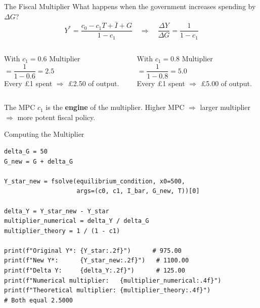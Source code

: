 \documentclass[aspectratio=169, 10pt]{beamer}
\begin{document}
\begin{frame}{The Fiscal Multiplier}
What happens when the government increases spending by $\Delta G$?
\vspace{0.3em}
\[
  Y^* = \frac{c_0 - c_1 T + \bar{I} + G}{1 - c_1}
  \quad\Longrightarrow\quad
  \frac{\Delta Y}{\Delta G} = \frac{1}{1 - c_1}
\]
\vspace{0.3em}
\begin{columns}[T]
\begin{block}{With $c_1 = 0.6$}
  Multiplier $= \dfrac{1}{1 - 0.6} = 2.5$\\[6pt]
  Every \pounds1 spent $\Rightarrow$ \pounds2.50 of output.
\end{block}
\begin{block}{With $c_1 = 0.8$}
  Multiplier $= \dfrac{1}{1 - 0.8} = 5.0$\\[6pt]
  Every \pounds1 spent $\Rightarrow$ \pounds5.00 of output.
\end{block}
\end{columns}
\vspace{0.5em}
The MPC $c_1$ is the \textbf{engine} of the multiplier.
Higher MPC $\Rightarrow$ larger multiplier $\Rightarrow$ more potent fiscal policy.
\end{frame}

\begin{frame}[fragile]{Computing the Multiplier}
\begin{lstlisting}
delta_G = 50
G_new = G + delta_G

Y_star_new = fsolve(equilibrium_condition, x0=500,
                    args=(c0, c1, I_bar, G_new, T))[0]

delta_Y = Y_star_new - Y_star
multiplier_numerical = delta_Y / delta_G
multiplier_theory = 1 / (1 - c1)

print(f"Original Y*: {Y_star:.2f}")      # 975.00
print(f"New Y*:      {Y_star_new:.2f}")   # 1100.00
print(f"Delta Y:     {delta_Y:.2f}")      # 125.00
print(f"Numerical multiplier:   {multiplier_numerical:.4f}")
print(f"Theoretical multiplier: {multiplier_theory:.4f}")
# Both equal 2.5000
\end{lstlisting}
\end{frame}
\end{document}
